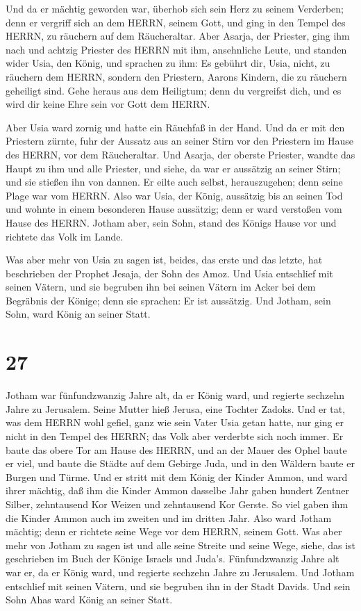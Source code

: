  Und da er mächtig geworden war, überhob sich sein Herz zu
seinem Verderben; denn er vergriff sich an dem HERRN, seinem Gott, und
ging in den Tempel des HERRN, zu räuchern auf dem Räucheraltar.
 Aber Asarja, der Priester, ging ihm nach und achtzig
Priester des HERRN mit ihm, ansehnliche Leute,  und standen
wider Usia, den König, und sprachen zu ihm: Es gebührt dir, Usia, nicht,
zu räuchern dem HERRN, sondern den Priestern, Aarons Kindern, die zu
räuchern geheiligt sind. Gehe heraus aus dem Heiligtum; denn du
vergreifst dich, und es wird dir keine Ehre sein vor Gott dem HERRN.

 Aber Usia ward zornig und hatte ein Räuchfaß in der Hand.
Und da er mit den Priestern zürnte, fuhr der Aussatz aus an seiner Stirn
vor den Priestern im Hause des HERRN, vor dem Räucheraltar.
 Und Asarja, der oberste Priester, wandte das Haupt zu ihm
und alle Priester, und siehe, da war er aussätzig an seiner Stirn; und
sie stießen ihn von dannen. Er eilte auch selbst, herauszugehen; denn
seine Plage war vom HERRN.  Also war Usia, der König,
aussätzig bis an seinen Tod und wohnte in einem besonderen Hause
aussätzig; denn er ward verstoßen vom Hause des HERRN. Jotham aber, sein
Sohn, stand des Königs Hause vor und richtete das Volk im Lande.

 Was aber mehr von Usia zu sagen ist, beides, das erste und
das letzte, hat beschrieben der Prophet Jesaja, der Sohn des Amoz.
 Und Usia entschlief mit seinen Vätern, und sie begruben
ihn bei seinen Vätern im Acker bei dem Begräbnis der Könige; denn sie
sprachen: Er ist aussätzig. Und Jotham, sein Sohn, ward König an seiner
Statt.

\hypertarget{section-26}{%
\section{27}\label{section-26}}

 Jotham war fünfundzwanzig Jahre alt, da er König ward, und
regierte sechzehn Jahre zu Jerusalem. Seine Mutter hieß Jerusa, eine
Tochter Zadoks.  Und er tat, was dem HERRN wohl gefiel, ganz
wie sein Vater Usia getan hatte, nur ging er nicht in den Tempel des
HERRN; das Volk aber verderbte sich noch immer.  Er baute
das obere Tor am Hause des HERRN, und an der Mauer des Ophel baute er
viel,  und baute die Städte auf dem Gebirge Juda, und in den
Wäldern baute er Burgen und Türme.  Und er stritt mit dem
König der Kinder Ammon, und ward ihrer mächtig, daß ihm die Kinder Ammon
dasselbe Jahr gaben hundert Zentner Silber, zehntausend Kor Weizen und
zehntausend Kor Gerste. So viel gaben ihm die Kinder Ammon auch im
zweiten und im dritten Jahr.  Also ward Jotham mächtig; denn
er richtete seine Wege vor dem HERRN, seinem Gott.  Was aber
mehr von Jotham zu sagen ist und alle seine Streite und seine Wege,
siehe, das ist geschrieben im Buch der Könige Israels und Juda's.
 Fünfundzwanzig Jahre alt war er, da er König ward, und
regierte sechzehn Jahre zu Jerusalem.  Und Jotham entschlief
mit seinen Vätern, und sie begruben ihn in der Stadt Davids. Und sein
Sohn Ahas ward König an seiner Statt.

